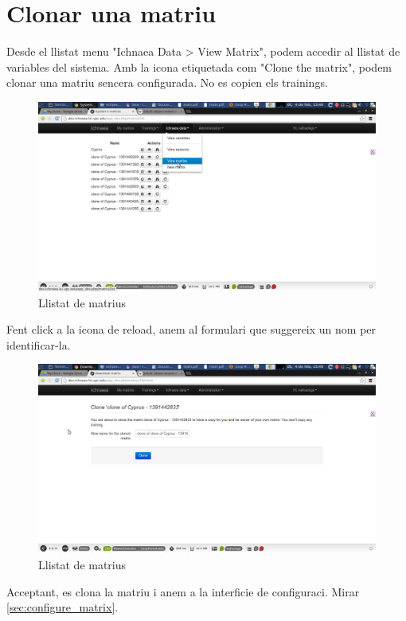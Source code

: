 \section{Clonar una matriu}
\label{sec:clone_matrix}
Desde el llistat menu "Ichnaea Data > View Matrix", podem accedir al llistat de variables del sistema. Amb la icona etiquetada com "Clone the matrix", podem clonar una matriu sencera configurada. No es copien els trainings.
\begin{figure}[h!]
  \centering
  \includegraphics[scale=0.2]{img/userguide/clone_matrix.png}
  \caption{Llistat de matrius}
  \label{fig:placement}
\end{figure}
Fent click a la icona de reload, anem al formulari que suggereix un nom per identificar-la.
\begin{figure}[h!]
  \centering
  \includegraphics[scale=0.2]{img/userguide/clone_matrix-2.png}
  \caption{Llistat de matrius}
  \label{fig:placement}
\end{figure}
Acceptant, es clona la matriu i anem a la interficie de configuraci. Mirar \ref{sec:configure_matrix}.

